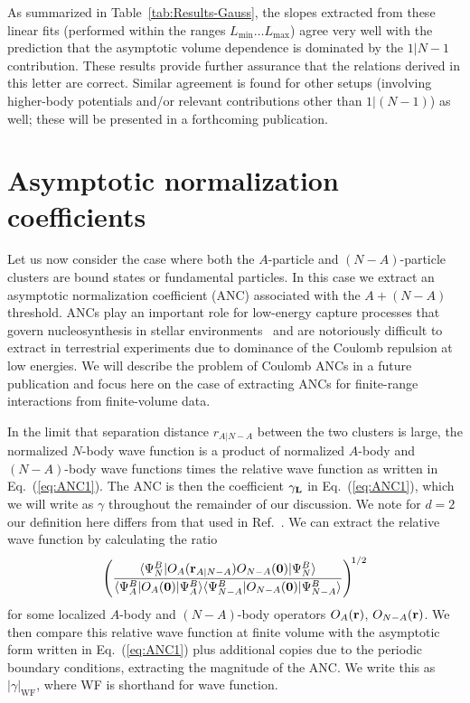 \documentclass[aps,singlecolumn,superscriptaddress,nofootinbib,tightenlines,
preprintnumbers,showkeys]{revtex4-1}
\newcommand{\bra}[1]{\langle #1|}
\newcommand{\ket}[1]{|#1\rangle}
\newcommand{\abs}[1]{\left|#1\right|}
\begin{document}
As summarized in Table~\ref{tab:Results-Gauss}, the slopes extracted from these
linear fits (performed within the ranges $L_{\text{min}} \ldots 
L_{\text{max}}$) agree very well with the prediction that the 
asymptotic volume dependence is dominated by the $1|N{-}1$ contribution.
These results provide further assurance that the relations derived in this 
letter are correct.  Similar agreement is found for other setups (involving 
higher-body potentials and/or relevant contributions other than $1|(N{-}1)$) as 
well; these will be presented in a forthcoming publication.

\section*{Asymptotic normalization coefficients}

Let us now consider the case where both the $A$-particle and $(N{-}A)$-particle
clusters are bound states or fundamental particles. In this case we extract an 
asymptotic normalization coefficient (ANC) associated with the $A+(N{-}A)$ 
threshold.  ANCs play an important role for low-energy capture processes that 
govern nucleosynthesis in stellar 
environments~\cite{Xu:1994zz,Capel:2013zka,Zhang:2014zsa,Hammer:2017tjm} and 
are notoriously difficult to extract in terrestrial experiments due to dominance 
of the Coulomb repulsion at low energies.  We will describe the problem of 
Coulomb ANCs in a future publication and focus here on the case of extracting
ANCs for finite-range interactions from finite-volume data.  

In the limit that separation distance $r_{A|N{-}A}$ between the two clusters is
large, the normalized $N$-body wave function is a product of normalized $A$-body 
and $(N{-}A)$-body wave functions times the relative wave function as written 
in Eq.~(\ref{eq:ANC1}).  The ANC is then the coefficient $\gamma_{\bf L}$ in 
Eq.~(\ref{eq:ANC1}), which we will write as $\gamma$ throughout the remainder 
of our discussion.  We note for $d=2$ our definition here differs from that used 
in Ref.~\cite{Konig:2011ti}.  We can extract the relative wave function by 
calculating the ratio
%
\begin{equation}
 \left(\frac{\bra {\Psi^B_N} O_A({\bf r}_{A|N-A}) O_{N-A}({\bf 0}) \ket 
 {\Psi^B_N}}
 {\bra {\Psi^B_A} O_A({\bf 0}) \ket {\Psi^B_{A}} \bra {\Psi^B_{N-A}}
 O_{N-A}({\bf 0}) \ket {\Psi^B_{N-A}}}\right)^{\!1/2}
\label{eq:Psi-O}
\end{equation}
%
for some localized $A$-body and $(N{-}A)$-body operators $O_{A}({\bf r})$, 
$O_{N-A}({\bf r})$.  We then compare this relative wave function at 
finite volume with the asymptotic form written in Eq.~(\ref{eq:ANC1}) plus 
additional copies due to the periodic boundary conditions, extracting the 
magnitude of the ANC.  We write this as $\abs{\gamma}_{\text{WF}}$, where WF 
is shorthand for wave function.
\end{document}
